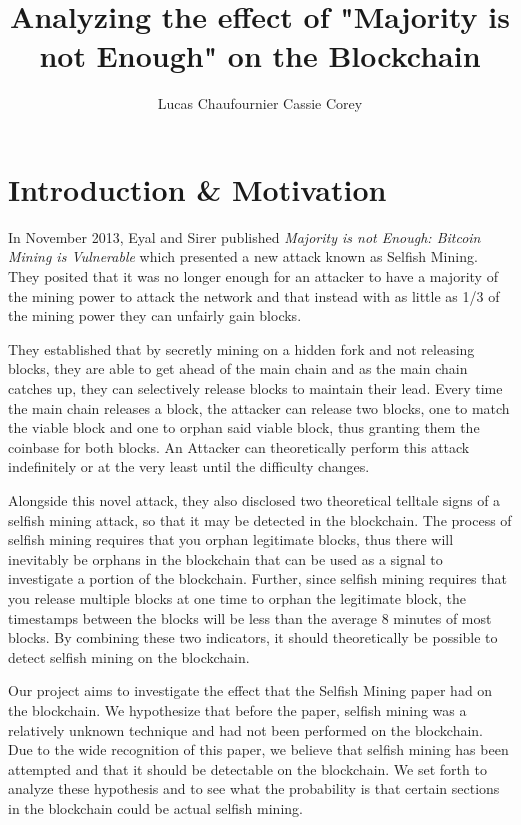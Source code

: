 \documentclass{sig-alternate-05-2015}
\title{Analyzing the effect of "Majority is not Enough" on the Blockchain}
\author{
\alignauthor
Lucas Chaufournier 
\alignauthor
Cassie Corey}
\begin{document}
\maketitle


\section{Introduction \& Motivation}
In November 2013, Eyal and Sirer published \textit{Majority is not
Enough: Bitcoin Mining is Vulnerable} which presented a new attack known as
Selfish Mining. They posited that it was no longer enough for an attacker
to have a majority of the mining power to attack the network and that
instead with as little as 1/3 of the mining power they can unfairly gain
blocks. 

They established that by secretly mining on a hidden fork and not releasing
blocks, they are able to get ahead of the main chain and as the main chain
catches up, they can selectively release blocks to maintain their lead.
Every time the main chain releases a block, the attacker can release two
blocks, one to match the viable block and one to orphan said viable block,
thus granting them the coinbase for both blocks. An Attacker can
theoretically perform this attack indefinitely or at the very least until the difficulty changes. 

Alongside this novel attack, they also disclosed
two theoretical telltale signs of a selfish mining attack, so that it may be detected
in the blockchain. The process of selfish mining requires that you
orphan legitimate blocks, thus there will inevitably be orphans in the
blockchain that can be used as a signal to investigate a portion of the blockchain. Further, since
selfish mining requires that you release multiple blocks at one time to
orphan the legitimate block, the timestamps between the blocks will be less
than the average 8 minutes of most blocks. By combining these two indicators, it should theoretically be possible to detect selfish mining on the blockchain. 

Our project aims to investigate the effect that the Selfish Mining paper had on the blockchain. We hypothesize that before the paper, selfish mining was a relatively unknown technique and had not been performed on the blockchain. Due to the wide recognition of this paper, we believe that selfish mining has been attempted and that it should be detectable on the blockchain. We set forth to analyze these hypothesis and to see what the probability is that certain sections in the blockchain could be actual selfish mining.  
\end{document}
